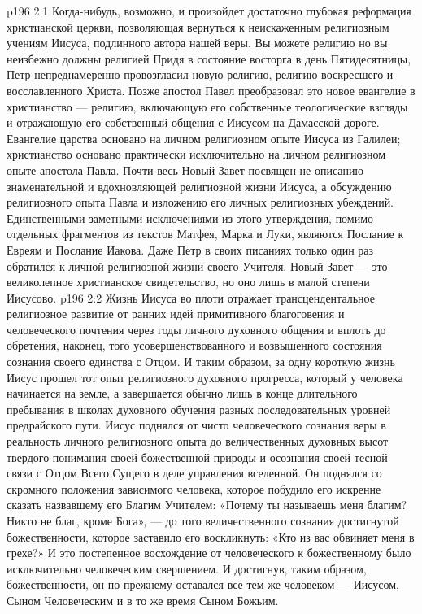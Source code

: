 \vs p196 2:1 Когда\hyp{}нибудь, возможно, и произойдет достаточно глубокая реформация христианской церкви, позволяющая вернуться к неискаженным религиозным учениям Иисуса, подлинного автора нашей веры. Вы можете  религию  но вы неизбежно должны  религией  Придя в состояние восторга в день Пятидесятницы, Петр непреднамеренно провозгласил новую религию, религию воскресшего и восславленного Христа. Позже апостол Павел преобразовал это новое евангелие в христианство --- религию, включающую его собственные теологические взгляды и отражающую его собственный  общения с Иисусом на Дамасской дороге. Евангелие царства основано на личном религиозном опыте Иисуса из Галилеи; христианство основано практически исключительно на личном религиозном опыте апостола Павла. Почти весь Новый Завет посвящен не описанию знаменательной и вдохновляющей религиозной жизни Иисуса, а обсуждению религиозного опыта Павла и изложению его личных религиозных убеждений. Единственными заметными исключениями из этого утверждения, помимо отдельных фрагментов из текстов Матфея, Марка и Луки, являются Послание к Евреям и Послание Иакова. Даже Петр в своих писаниях только один раз обратился к личной религиозной жизни своего Учителя. Новый Завет --- это великолепное христианское свидетельство, но оно лишь в малой степени Иисусово.
\vs p196 2:2 Жизнь Иисуса во плоти отражает трансцендентальное религиозное развитие от ранних идей примитивного благоговения и человеческого почтения через годы личного духовного общения и вплоть до обретения, наконец, того усовершенствованного и возвышенного состояния сознания своего единства с Отцом. И таким образом, за одну короткую жизнь Иисус прошел тот опыт религиозного духовного прогресса, который у человека начинается на земле, а завершается обычно лишь в конце длительного пребывания в школах духовного обучения разных последовательных уровней предрайского пути. Иисус поднялся от чисто человеческого сознания веры в реальность личного религиозного опыта до величественных духовных высот твердого понимания своей божественной природы и осознания своей тесной связи с Отцом Всего Сущего в деле управления вселенной. Он поднялся со скромного положения зависимого человека, которое побудило его искренне сказать назвавшему его Благим Учителем: «Почему ты называешь меня благим? Никто не благ, кроме Бога», --- до того величественного сознания достигнутой божественности, которое заставило его воскликнуть: «Кто из вас обвиняет меня в грехе?» И это постепенное восхождение от человеческого к божественному было исключительно человеческим свершением. И достигнув, таким образом, божественности, он по\hyp{}прежнему оставался все тем же человеком --- Иисусом, Сыном Человеческим и в то же время Сыном Божьим.
